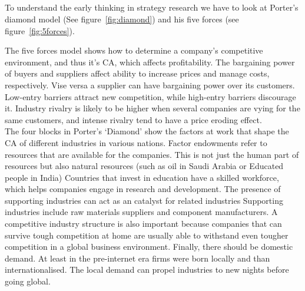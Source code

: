 \subsection{} %


To understand the early thinking in strategy research we have to look at Porter's diamond model (See figure~\ref{fig:diamond}) and his five forces (see figure~\ref{fig:5forces}).  


The five forces model shows how to determine a company's competitive environment, and thus it's \gls{CA}, which affects profitability. 
The bargaining power of buyers and suppliers affect ability to increase prices and manage costs, respectively. 
Vise versa a supplier can have bargaining power over its customers. Low-entry barriers attract new competition, while high-entry barriers discourage it. 
Industry rivalry is likely to be higher when several companies are vying for the same customers, and intense rivalry tend to have a price eroding effect.\\


The four blocks in Porter's `Diamond' show the factors at work that shape the \gls{CA} of different industries in various nations.
Factor endowments refer to resources that are available for the companies. This is not just the human part of resources but also natural resources (such as oil in Saudi Arabia or Educated people in India)
Countries that invest in education have a skilled workforce, which helps companies engage in research and development. 
The presence of supporting industries can act as an catalyst for related industries
Supporting industries include raw materials suppliers and component manufacturers. 
A competitive industry structure is also important because companies that can survive tough competition at home are usually able to withstand even tougher competition in a global business environment.
Finally, there should be domestic demand. At least in the pre-internet era firms were born locally and than internationalised. The local demand can propel industries to new nights before going global.



